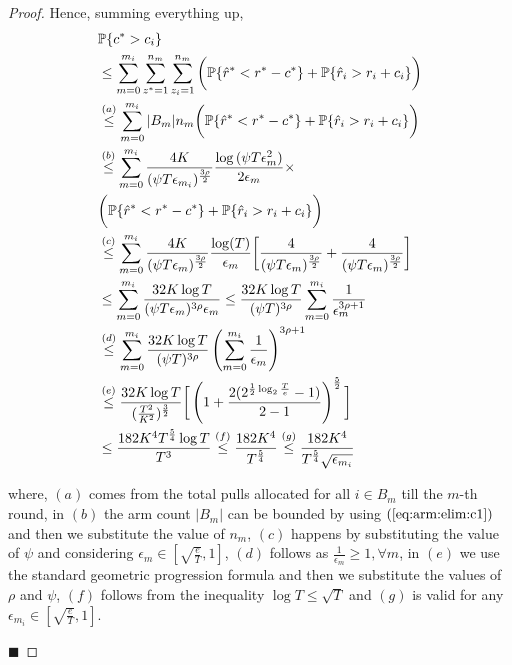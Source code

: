 \begin{proof}
Hence, summing everything up, 
\begin{align*}
&\mathbb{P}\lbrace c^{*} > c_i \rbrace \\
&\leq \sum_{m=0}^{m_i}\sum_{z^* =1}^{n_{m}}\sum_{z_i =1}^{n_{m}}\bigg(\mathbb{P}\lbrace \hat{r}^* < r^* - c^{*}\rbrace + \mathbb{P}\lbrace \hat{r}_i > r_i + c_i\rbrace\bigg)\\
&\overset{(a)}{\leq} \sum_{m=0}^{m_i}|B_{m}|n_{m}\bigg(\mathbb{P}\lbrace \hat{r}^* < r^* - c^{*}\rbrace + \mathbb{P}\lbrace \hat{r}_i > r_i + c_i\rbrace\bigg)\\
&\overset{(b)}{\leq} \sum_{m=0}^{m_i}\dfrac{4K}{(\psi T \epsilon_{m_i})^{\frac{3\rho}{2}}}\dfrac{\log{(\psi T\epsilon_{m}^{2})}}{2\epsilon_{m}}\times 
\\
&\bigg(\mathbb{P}\lbrace \hat{r}^* < r^* - c^{*}\rbrace + \mathbb{P}\lbrace \hat{r}_i > r_i + c_i\rbrace\bigg)\\
&\overset{(c)}{\leq} \sum_{m=0}^{m_i}\dfrac{4K}{(\psi T \epsilon_{m})^{\frac{3\rho}{2}}}\dfrac{\log(T)}{\epsilon_{m}}\bigg[\frac{4}{(\psi T\epsilon_{m})^{\frac{3\rho}{2}}} + \frac{4}{(\psi T\epsilon_{m})^{\frac{3\rho}{2}}}  \bigg]\\
&\leq \sum_{m=0}^{m_i}\dfrac{32K\log T}{(\psi T\epsilon_{m})^{3\rho}\epsilon_{m}} \leq 
\dfrac{32K\log T}{(\psi T)^{3\rho}}\sum_{m=0}^{m_i}\dfrac{1}{\epsilon_{m}^{3\rho + 1}} \\
&\overset{(d)}{\leq} \sum_{m=0}^{m_i}\dfrac{32K\log T}{(\psi T)^{3\rho}}\left(\sum_{m=0}^{m_i}\dfrac{1}{\epsilon_{m}}\right)^{3\rho + 1}\\
&\overset{(e)}{\leq} 
\dfrac{32 K\log T}{(\frac{T^2}{K^2})^{\frac{3}{2}}}\bigg[\left( 1 + \dfrac{2(2^{ \frac{1}{2}\log_{2} \frac{T}{e}}-1)}{2-1} \right)^{\frac{5}{2}}\bigg] \\
&\leq \dfrac{182 K^4 T^{\frac{5}{4}}\log T}{T^3} \overset{(f)}{\leq} \dfrac{182 K^4}{T^{\frac{5}{4}}} \overset{(g)}{\leq} \dfrac{182 K^4}{T^{\frac{5}{4}}\sqrt{\epsilon_{m_i}}}
\end{align*}

where, $(a)$ comes from the total pulls allocated for all $i\in B_m$ till the $m$-th round, in $(b)$ the arm count $|B_m|$ can be bounded by using $(\ref{eq:arm:elim:c1})$ and then we substitute the value of $n_{m}$, $(c)$ happens by substituting the value of $\psi$ and considering $\epsilon_{m}\in [\sqrt{\frac{e}{T}},1]$, $(d)$ follows as $\frac{1}{\epsilon_{m}}\geq 1,\forall m $, in $(e)$ we use the standard geometric progression formula and then we substitute the values of $\rho$ and $\psi$, $(f)$ follows from the inequality $\log T \leq \sqrt{T}$ and $(g)$ is valid for any $\epsilon_{m_i}\in[\sqrt{\frac{e}{T}},1]$. 

\hfill $\blacksquare$	
\end{proof}


